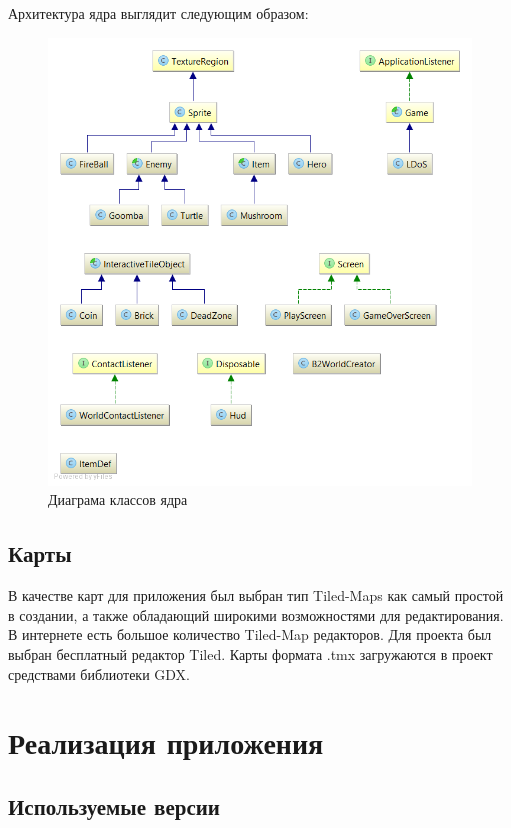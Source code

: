 Архитектура ядра выглядит следующим образом:
\begin{figure}[H]
	\begin{center}
		\includegraphics[scale=0.7]{pics/diagram.png}
		\caption{Диаграма классов ядра} 
		\label{pic:pic_name} %
	\end{center}
\end{figure}


\subsection{Карты}

В качестве карт для приложения был выбран тип Tiled-Maps как самый простой в создании, а также обладающий широкими возможностями для редактирования. 
\\ В интернете есть большое количество Tiled-Map редакторов. Для проекта был выбран бесплатный редактор Tiled. Карты формата .tmx загружаются в проект средствами библиотеки GDX.

\section{Реализация приложения}

\subsection{Используемые версии}

